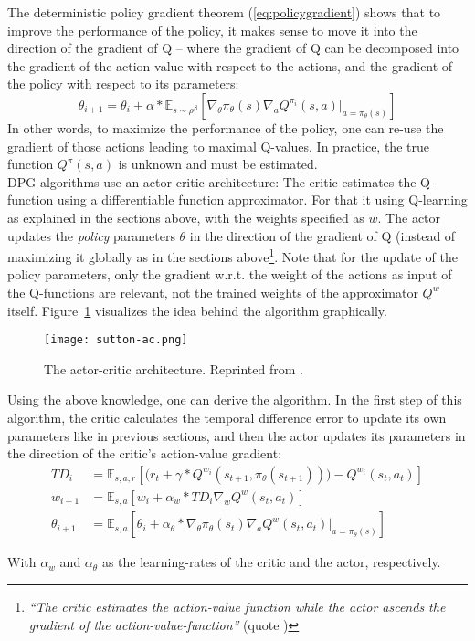 The deterministic policy gradient theorem (\ref{eq:policygradient}) shows that to improve the performance of the policy, it makes sense to move it into the direction of the gradient of Q -- where the gradient of Q can be decomposed into the gradient of the action-value with respect to the actions, and the gradient of the policy with respect to its parameters:
\begin{equation*}
	\theta_{i+1} = \theta_i + \alpha * \mathds{E}_{s \sim \rho^\beta} \left[ \nabla_\theta \pi_{\theta}(s) \nabla_a Q^{\pi_i}(s,a) \big|_{a=\pi_\theta(s)} \right]
\end{equation*} 
In other words, to maximize the performance of the policy, one can re-use the gradient of those actions leading to maximal Q-values. In practice, the true function $Q^\pi(s,a)$ is unknown and must be estimated.\\

\noindent DPG algorithms use an actor-critic architecture: The critic estimates the Q-function using a differentiable function approximator. For that it using Q-learning as explained in the sections above, with the weights specified as $w$. The actor updates the \textit{policy} parameters $\theta$ in the direction of the gradient of Q (instead of maximizing it globally as in the sections above\footnote{\textit{``The critic estimates the action-value function while the actor ascends the gradient of the action-value-function''} (quote \cite{silver_deterministic_2014})}. Note that for the update of the policy parameters, only the gradient w.r.t. the weight of the actions as input of the Q-functions are relevant, not the trained weights of the approximator $Q^w$ itself. Figure~\ref{fig:actorcritic} visualizes the idea behind the algorithm graphically.
\begin{figure}[h]
	\texttt{[image: sutton-ac.png]}
	\centering
	\caption{The actor-critic architecture. Reprinted from \cite{richard_s._sutton_reinforcement_1998}.}
	\label{fig:actorcritic}
\end{figure}

\noindent Using the above knowledge, one can derive the  algorithm. In the first step of this algorithm, the critic calculates the temporal difference error to update its own parameters like in previous sections, and then the actor updates its parameters in the direction of the critic's action-value gradient:
\begin{align}
	TD_i    &= \mathds{E}_{s,a,r} \left[ \big( r_t + \gamma * Q^{w_i}(s_{t+1}, \pi_{\theta}(s_{t+1})) \big) - Q^{w_i}(s_t, a_t) \right]\\
	w_{i+1} &= \mathds{E}_{s,a} \left[  w_i + \alpha_w * TD_i \nabla_w Q^w(s_t, a_t) \right] \\
	\theta_{i+1} &= \mathds{E}_{s,a} \left[ \theta_i + \alpha_\theta * \nabla_\theta \pi_\theta(s_t) \nabla_a Q^w(s_t,a_t) \big|_{a=\pi_\theta(s)} \right]
\end{align}
\begin{flushright} \small With $\alpha_w$ and $\alpha_\theta$ as the learning-rates of the critic and the actor, respectively. \end{flushright}

